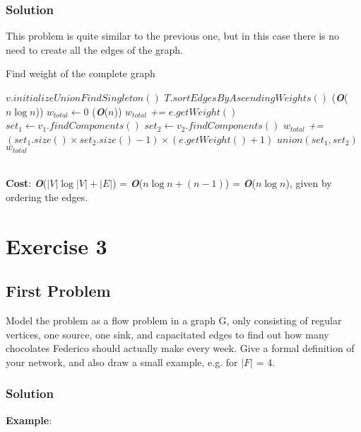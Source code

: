 \documentclass[11pt]{article}
\begin{document}
\subsubsection*{Solution}
This problem is quite similar to the previous one, but in this case there is no need to create all the edges of the graph.
\begin{algorithm}
	\caption{Find weight of the complete graph}\label{euclid}
	\begin{algorithmic}[1]
			\State $v.initializeUnionFindSingleton()$
		\EndFor
		\State $T.sortEdgesByAscendingWeights()$ \qquad \qquad \qquad \qquad \qquad \qquad \qquad (\textbf{\textit{O}}($n\log{n}$))
		\State $w_{total} \gets 0$
		 \qquad \qquad \qquad \qquad \qquad \qquad \qquad \qquad \qquad \qquad (\textbf{\textit{O}}($n$))
			\State $w_{total}$ \textit{+=} $e.getWeight()$
			\State  $set_1 \gets v_1.findComponents()$
			\State  $set_2 \gets v_2.findComponents()$
			\State $w_{total}$ \textit{+=} $(set_1.size() \times set_2.size() - 1) \times (e.getWeight() + 1)$
			\State $union(set_1, set_2)$
		\EndFor
		\State \Return $w_{total}$
	\end{algorithmic}
\end{algorithm} \\
\textbf{Cost}: \textbf{\textit{O}}($|V|\log{|V|} + |E|$) = \textbf{\textit{O}}($n\log{n} + (n-1)$) = \textbf{\textit{O}}($n\log{n}$), given by ordering the edges.
\newpage

\section*{Exercise 3}
\subsection*{First Problem}
Model the problem as a flow problem in a graph G, only consisting of regular vertices, one
source, one sink, and capacitated edges to find out how many chocolates Federico should
actually make every week. Give a formal definition of your network, and also draw a small
example, e.g. for $|F|$ = 4.
\subsubsection*{Solution}

\textbf{Example}:
\end{document}
